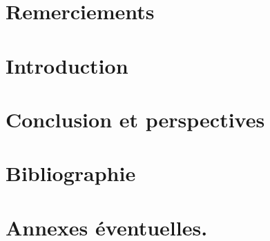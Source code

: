 \documentclass[11pt,a4paper]{article}
\begin{document}


\thispagestyle{empty}
\section*{Remerciements}

\tableofcontents
\newpage

\setcounter{page}{1}

\setlength{\parindent}{16pt}

\section{Introduction}






\section{Conclusion et perspectives}

\section{Bibliographie}

\section{Annexes éventuelles.}
\nocite{*}

\newpage

 

\end{document}
